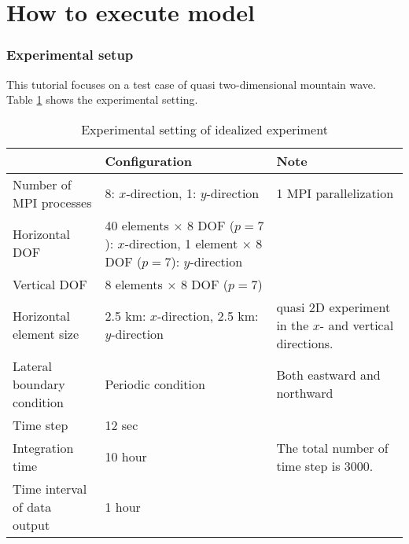 \section{How to execute model} \label{sec:ideal_exp_run}


\subsubsection{Experimental setup}
This tutorial focuses on 
a test case of quasi two-dimensional mountain wave.
Table \ref{tab:setting_ideal} shows the experimental setting.

\begin{table}[htb]
\begin{minipage}{150mm}
\begin{center}
\caption{Experimental setting of idealized experiment}
\begin{tabularx}{150mm}{|l|X|X|} \hline
 \rowcolor[gray]{0.9} ~~ & Configuration & Note \\ \hline
 Number of MPI processes& 8: $x$-direction, 1: $y$-direction & 1 MPI parallelization \\ \hline
 Horizontal DOF & 40 elements $\times$ 8 DOF ($p=7$): $x$-direction, 1 element $\times$ 8 DOF ($p=7$): $y$-direction &  \\ \hline
 Vertical DOF & 8 elements $\times$ 8 DOF ($p=7$) & \\ \hline
 Horizontal element size & 2.5 km: $x$-direction, 2.5 km: $y$-direction & quasi 2D experiment in the $x$- and vertical directions. \\ \hline
 Lateral boundary condition & Periodic condition & Both eastward and northward \\ \hline
 Time step & 12 sec      &  \\ \hline
 Integration time     & 10 hour & The total number of time step is 3000.\\ \hline
 Time interval of data output & 1 hour  &  \\ \hline
\end{tabularx}
\label{tab:setting_ideal}
\end{center}
\end{minipage}
\end{table}

